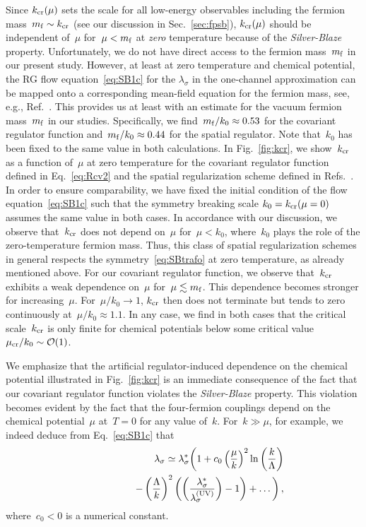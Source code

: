 \documentclass[prd,english,preprintnumbers,amsmath,amssymb,nofootinbib,twocolumn,superscriptaddress]{revtex4-1}
\newcommand{\be}{\begin{eqnarray}}
\newcommand{\ee}{\end{eqnarray}}
\newcommand{\nn}{\nonumber }
\begin{document}
{{Since $k_{\rm cr}(\mu)$ sets the scale for all low-energy observables including the fermion mass~$m_{\rm f}\sim k_{\rm cr}$ (see our 
discussion in Sec.~\ref{sec:fpsb}),
$k_{\rm cr}(\mu)$ should be independent of~$\mu$ for~$\mu < m_{\rm f}$ at {\it zero} temperature
because of the {\it Silver-Blaze} property. 
{Unfortunately, we do not have direct access to the fermion mass~$m_{\rm f}$ in our present study. However,
at least at zero temperature and chemical potential, the RG flow equation~\eqref{eq:SB1c} for the $\lambda_{\sigma}$ 
in the one-channel approximation can be mapped onto a corresponding mean-field equation for the fermion mass, 
see, e.g., Ref.~\cite{Braun:2011pp}. This provides us at least with an estimate for 
the vacuum fermion mass~$m_{\rm f}$ in our studies. Specifically, we find~$m_{\rm f}/k_0\approx 0.53$
for the covariant regulator function and~$m_{\rm f}/k_0\approx 0.44$ for the spatial regulator. Note that~$k_0$ has been fixed 
to the same value in both calculations.}
In Fig.~\ref{fig:kcr}, we show~$k_{\rm cr}$ as a function of~$\mu$ at zero 
temperature for the covariant regulator function
defined in Eq.~\eqref{eq:Rcv2} and the spatial 
{regularization scheme} defined in Refs.~\cite{Braun:2003ii,Schaefer:2004en,Blaizot:2006rj,Litim:2006ag}. In order to ensure
comparability, we have fixed the initial condition of the flow equation~\eqref{eq:SB1c} such that 
the symmetry breaking scale $k_0=k_{\rm cr}(\mu =0)$
assumes the same value in both cases. In accordance with our discussion, we observe that~$k_{\rm cr}$ 
does not depend on~$\mu$ for~$\mu < k_0$,
where~$k_0$ plays the role of the zero-temperature fermion mass.
Thus, this class of spatial regularization schemes in general respects the symmetry~\eqref{eq:SBtrafo} at zero temperature,
as already mentioned above. For our covariant
regulator function, we observe that~$k_{\rm cr}$ exhibits a weak {dependence on~$\mu$ for~$\mu \lesssim m_{\rm f}$. This}
dependence becomes stronger for increasing~$\mu$. For~$\mu/k_0\to 1$, $k_{\rm cr}$ then does not terminate but tends to zero continuously
at~$\mu/k_0\approx 1.1$. In any case, we find in both cases 
that the critical scale~$k_{\rm cr}$ is only finite for chemical potentials below some critical value~$\mu_{\rm cr}/k_0 \sim {\mathcal O}(1)$.

We emphasize that the artificial regulator-induced dependence on the chemical potential illustrated in Fig.~\ref{fig:kcr}
is an immediate consequence of the fact that our covariant regulator function violates the 
{\it Silver-Blaze} property. This violation becomes {evident by the fact that the} four-fermion
couplings depend on the chemical potential~$\mu$ at~$T=0$ for any value of~$k$. 
For~$k \gg \mu$, for example, we indeed deduce from Eq.~\eqref{eq:SB1c} that
%
\be
&& \lambda_{\sigma} \simeq \lambda_{\sigma}^{\ast} \bigg( 1
  + c_0\left(\frac{\mu}{k}\right)^2\ln\left(\frac{k}{\Lambda}\right)\nn\\
&& \qquad\qquad\; - \left(\frac{\Lambda}{k}\right)^2 \left(  \left(\frac{ \lambda_{\sigma}^{\ast}}{\lambda_{\sigma}^{(\rm UV)}} \right) -1 
\right)   
+\dots \bigg)\,,
\ee
where~$c_0<0$ is a numerical constant. 
 
}}
\end{document}
